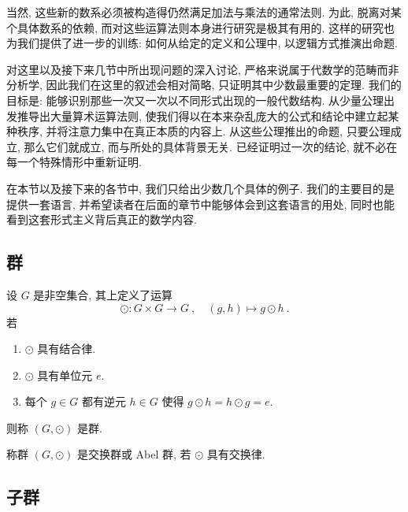 当然, 这些新的数系必须被构造得仍然满足加法与乘法的通常法则. 为此, 脱离对某个具体数系的依赖, 而对这些运算法则本身进行研究是极其有用的. 这样的研究也为我们提供了进一步的训练: 如何从给定的定义和公理中, 以逻辑方式推演出命题.

对这里以及接下来几节中所出现问题的深入讨论, 严格来说属于代数学的范畴而非分析学, 因此我们在这里的叙述会相对简略, 只证明其中少数最重要的定理. 我们的目标是: 能够识别那些一次又一次以不同形式出现的一般代数结构. 从少量公理出发推导出大量算术运算法则, 使我们得以在本来杂乱庞大的公式和结论中建立起某种秩序, 并将注意力集中在真正本质的内容上. 从这些公理推出的命题, 只要公理成立, 那么它们就成立, 而与所处的具体背景无关. 已经证明过一次的结论, 就不必在每一个特殊情形中重新证明.

在本节以及接下来的各节中, 我们只给出少数几个具体的例子. 我们的主要目的是提供一套语言, 并希望读者在后面的章节中能够体会到这套语言的用处, 同时也能看到这套形式主义背后真正的数学内容.

\subsection{群}

\begin{axiom}[群]
    设 \(G\) 是非空集合, 其上定义了运算
    \[
        \odot \colon G \times G \to G\ ,\quad (g, h) \mapsto g \odot h\ .
    \]
    若
    \begin{enumerate}[label={\((\mathrm G_{\arabic*})\)}]
        \item \(\odot\) 具有结合律.
        \item \(\odot\) 具有单位元 \(e\).
        \item 每个 \(g \in G\) 都有逆元 \(h \in G\) 使得 \(g \odot h = h \odot g = e\).
    \end{enumerate}
    则称 \((G, \odot)\) 是群.
\end{axiom}

\begin{definition}[Abel 群]
    称群 \((G, \odot)\) 是交换群或 Abel 群, 若 \(\odot\) 具有交换律.
\end{definition}

\begin{remark}\label{rem:group's-property}
    
\end{remark}

\subsection{子群}

